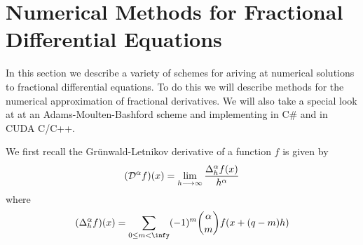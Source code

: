 
\section{Numerical Methods for Fractional Differential Equations}

In this section we describe a variety of schemes for ariving at numerical solutions to fractional differential equations. To do this we will describe methods for the numerical approximation of fractional derivatives. We will also take a special look at at an Adams-Moulten-Bashford scheme and implementing in C# and in CUDA C/C++.


We first recall the Gr\"{u}nwald-Letnikov derivative of a function $ f $ is given by
$$
	(\mathcal{D}^{\alpha}f)(x) = \lim_{h \longrightarrow \infty} \frac{\Delta_h^\alpha f(x)}{h^\alpha}
$$
where
$$
	(\Delta_h^\alpha f)(x) = \sum_{0 \leq m < \infy} (-1)^m {\alpha \choose m} f(x +(q-m)h)
$$